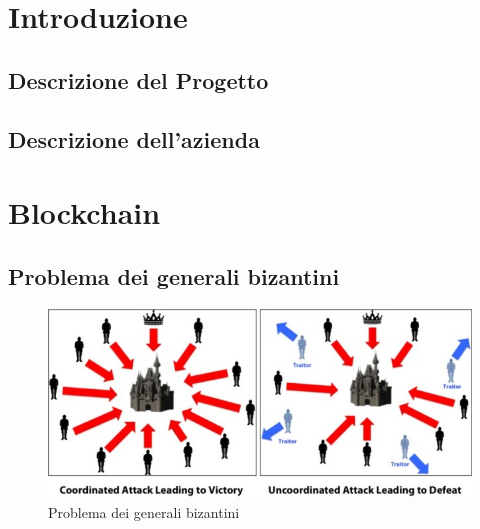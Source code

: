 \documentclass[12pt]{report}
\begin{document}
\chapter{Introduzione}
\section{Descrizione del Progetto}
\section{Descrizione dell’azienda}

\chapter{Blockchain}
\section{Problema dei generali bizantini}
\begin{figure}[h]
	\includegraphics[width=\textwidth]{BF}
	\centering
	\caption{Problema dei generali bizantini}
	\label{fig:ByzantinFault}
\end{figure}
\end{document}
